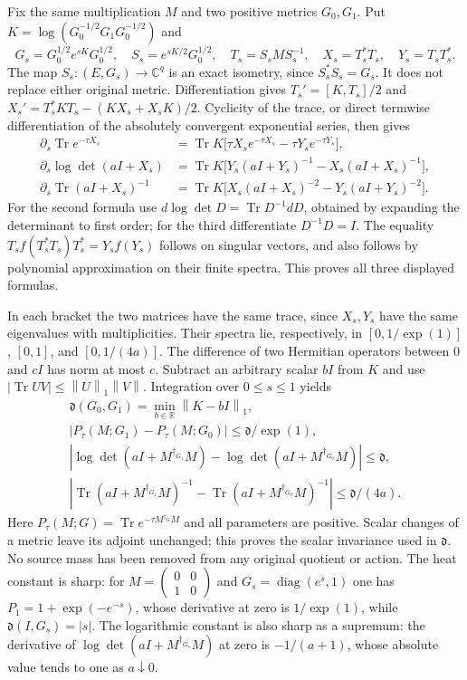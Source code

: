 \documentclass[11pt]{article}
\newcommand{\R}{\mathbb R}\newcommand{\C}{\mathbb C}
\newcommand{\norm}[1]{\left\lVert#1\right\rVert}
\newcommand{\Tr}{\operatorname{Tr}}\newcommand{\rank}{\operatorname{rank}}
\begin{document}
Fix the same multiplication $M$ and two positive metrics $G_0,G_1$.
Put $K=\log(G_0^{-1/2}G_1G_0^{-1/2})$ and
\[
G_s=G_0^{1/2}e^{sK}G_0^{1/2},\quad
S_s=e^{sK/2}G_0^{1/2},\quad T_s=S_sMS_s^{-1},\quad
X_s=T_s^*T_s,\quad Y_s=T_sT_s^*.
\]
The map $S_s:(E,G_s)\to\C^q$ is an exact isometry, since
$S_s^*S_s=G_s$. It does not replace either original metric.
Differentiation gives $T_s'=[K,T_s]/2$ and
$X_s'=T_s^*KT_s-(KX_s+X_sK)/2$. Cyclicity of the trace, or direct
termwise differentiation of the absolutely convergent exponential
series, then gives
\begin{equation}\tag{SD26}
\begin{aligned}
\partial_s\Tr e^{-\tau X_s}
&=\Tr K\bigl[\tau X_se^{-\tau X_s}-\tau Y_se^{-\tau Y_s}\bigr],\\
\partial_s\log\det(aI+X_s)
&=\Tr K\bigl[Y_s(aI+Y_s)^{-1}-X_s(aI+X_s)^{-1}\bigr],\\
\partial_s\Tr(aI+X_s)^{-1}
&=\Tr K\bigl[X_s(aI+X_s)^{-2}-Y_s(aI+Y_s)^{-2}\bigr].
\end{aligned}
\end{equation}
For the second formula use $d\log\det D=\Tr D^{-1}dD$, obtained by
expanding the determinant to first order; for the third differentiate
$D^{-1}D=I$. The equality
$T_s f(T_s^*T_s)T_s^*=Y_sf(Y_s)$ follows on singular vectors, and
also follows by polynomial approximation on their finite spectra.
This proves all three displayed formulas.

In each bracket the two matrices have the same trace, since $X_s,Y_s$
have the same eigenvalues with multiplicities. Their spectra lie,
respectively, in $[0,1/\exp(1)]$, $[0,1]$, and $[0,1/(4a)]$.
The difference of two Hermitian operators between $0$ and $cI$ has
norm at most $c$. Subtract an arbitrary scalar $bI$ from $K$ and use
$|\Tr UV|\le\norm U_1\norm V$. Integration over $0\le s\le1$ yields
\begin{equation}\tag{SD27}
\begin{gathered}
\mathfrak d(G_0,G_1)=\min_{b\in\R}\norm{K-bI}_1,\\
|P_\tau(M;G_1)-P_\tau(M;G_0)|\le\mathfrak d/\exp(1),\\
|\log\det(aI+M^{\dagger_{G_1}}M)
-\log\det(aI+M^{\dagger_{G_0}}M)|\le\mathfrak d,\\
|\Tr(aI+M^{\dagger_{G_1}}M)^{-1}
-\Tr(aI+M^{\dagger_{G_0}}M)^{-1}|\le\mathfrak d/(4a).
\end{gathered}
\end{equation}
Here $P_\tau(M;G)=\Tr e^{-\tau M^{\dagger_G}M}$ and all parameters
are positive. Scalar changes of a metric leave its adjoint unchanged;
this proves the scalar invariance used in $\mathfrak d$. No source
mass has been removed from any original quotient or action.
The heat constant is sharp: for
$M=\left(\begin{smallmatrix}0&0\\1&0\end{smallmatrix}\right)$ and
$G_s=\operatorname{diag}(e^s,1)$ one has
$P_1=1+\exp(-e^{-s})$, whose derivative at zero is $1/\exp(1)$,
while $\mathfrak d(I,G_s)=|s|$.
The logarithmic constant is also sharp as a supremum: the derivative
of $\log\det(aI+M^{\dagger_{G_s}}M)$ at zero is $-1/(a+1)$,
whose absolute value tends to one as $a\downarrow0$.
\end{document}
